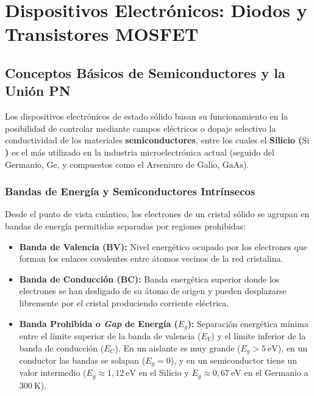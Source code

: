 \chapter{Dispositivos Electrónicos: Diodos y Transistores MOSFET}
\label{cap:tema4}


\section{Conceptos Básicos de Semiconductores y la Unión PN}

Los dispositivos electrónicos de estado sólido basan su funcionamiento en la posibilidad de controlar mediante campos eléctricos o dopaje selectivo la conductividad de los materiales \textbf{semiconductores}, entre los cuales el \textbf{Silicio ($\text{Si}$)} es el más utilizado en la industria microelectrónica actual (seguido del Germanio, $\text{Ge}$, y compuestos como el Arseniuro de Galio, $\text{GaAs}$).

\subsection{Bandas de Energía y Semiconductores Intrínsecos}
Desde el punto de vista cuántico, los electrones de un cristal sólido se agrupan en bandas de energía permitidas separadas por regiones prohibidas:
\begin{itemize}[leftmargin=*]
    \item \textbf{Banda de Valencia (BV):} Nivel energético ocupado por los electrones que forman los enlaces covalentes entre átomos vecinos de la red cristalina.
    \item \textbf{Banda de Conducción (BC):} Banda energética superior donde los electrones se han desligado de su átomo de origen y pueden desplazarse libremente por el cristal produciendo corriente eléctrica.
    \item \textbf{Banda Prohibida o \textit{Gap} de Energía ($E_g$):} Separación energética mínima entre el límite superior de la banda de valencia ($E_V$) y el límite inferior de la banda de conducción ($E_C$). En un aislante es muy grande ($E_g > 5\ \si{\electronvolt}$), en un conductor las bandas se solapan ($E_g = 0$), y en un semiconductor tiene un valor intermedio ($E_g \approx 1{,}12\ \si{\electronvolt}$ en el Silicio y $E_g \approx 0{,}67\ \si{\electronvolt}$ en el Germanio a $300\ \si{\kelvin}$).
\end{itemize}


